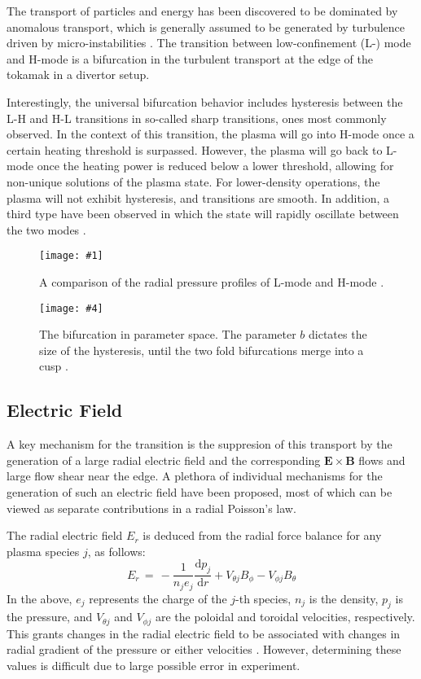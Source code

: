 \documentclass[a4paper]{article}
\newcommand\TwoFig[6]{%
	\sbox\IBoxA{\texttt{[image: \#1]}}
	\sbox\IBoxB{\texttt{[image: \#4]}}%
	\ifdim\ht\IBoxA>\ht\IBoxB
		\setlength\IHeight{\ht\IBoxB}%
	\else\setlength\IHeight{\ht\IBoxA}\fi
	\begin{figure}[!htb]
	\minipage[t]{0.45\textwidth}\centering
	\texttt{[image: \#1]}
	\caption{#2}\label{#3}
	\endminipage\hfill
	\minipage[t]{0.45\textwidth}\centering
	\texttt{[image: \#4]}
	\caption{#5}\label{#6}
	\endminipage
	\end{figure}%
}
\begin{document}
The transport of particles and energy has been discovered to be dominated by anomalous transport, which is generally assumed to be generated by turbulence driven by micro-instabilities \cite{freidberg_plasma_2007}.
The transition between low-confinement (L-) mode and H-mode is a bifurcation in the turbulent transport at the edge of the tokamak in a divertor setup.

Interestingly, the universal bifurcation behavior includes hysteresis between the L-H and H-L transitions in so-called sharp transitions, ones most commonly observed.
In the context of this transition, the plasma will go into H-mode once a certain heating threshold is surpassed.
However, the plasma will go back to L-mode once the heating power is reduced below a lower threshold, allowing for non-unique solutions of the plasma state.
For lower-density operations, the plasma will not exhibit hysteresis, and transitions are smooth.
In addition, a third type have been observed in which the state will rapidly oscillate between the two modes \cite{weymiens_bifurcation_2014}.

\TwoFig{../Graphics/L-mode_H-mode_compare.png}
	{A comparison of the radial pressure profiles of L-mode and H-mode \cite{weymiens_bifurcation_2014}.}
	{fig:L-mode_H-mode_compare}
	{../Graphics/Bif_3D.png}
	{The bifurcation in parameter space. The parameter $b$ dictates the size of the hysteresis, until the two fold bifurcations merge into a cusp \cite{weymiens_bifurcation_2014}.}
	{fig:Bif_3D}

\subsection{Electric Field}
A key mechanism for the transition is the suppresion of this transport by the generation of a large radial electric field and the corresponding $\mathbf{E}\times\mathbf{B}$ flows and large flow shear near the edge.
A plethora of individual mechanisms for the generation of such an electric field have been proposed, most of which can be viewed as separate contributions in a radial Poisson's law.

The radial electric field $E_r$ is deduced from the radial force balance for any plasma species $j$, as follows:
\begin{equation}
	E_r \,=\, -\frac{1}{n_j e_j} \frac{\text{d} p_j}{\text{d} r} + V_{\theta j} B_\phi - V_{\phi j} B_\theta
	\label{eq:E_r}
\end{equation}
In the above, $e_j$ represents the charge of the $j$-th species, $n_j$ is the density, $p_j$ is the pressure, and $V_{\theta j}$ and $V_{\phi j}$ are the poloidal and toroidal velocities, respectively.
This grants changes in the radial electric field to be associated with changes in radial gradient of the pressure or either velocities \cite{connor_review_2000}\cite{staps_backstepping_2017}.
However, determining these values is difficult due to large possible error in experiment.
\end{document}
